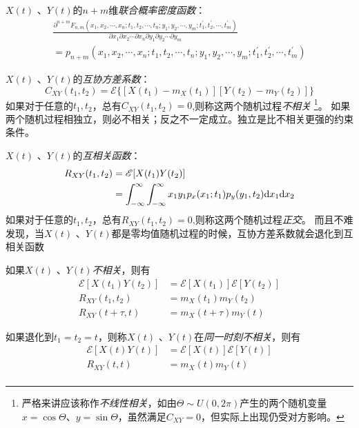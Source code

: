     $X(t)$ 、$Y(t)$的$n+m$维\emph{联合概率密度函数}：
    \begin{equation}
        \begin{split}
            \frac{\partial^{n+m}F_{n,m}(x_1,x_2,\cdots,x_n;t_1,t_2,\cdots,t_n;y_1,y_2,\cdots,y_m;t^{'}_1,t^{'}_2,\cdots,t^{'}_m)}{\partial x_1\partial x_2\cdots\partial x_n\partial y_1\partial y_2\cdots\partial y_m}\\
            =p_{n+m}(x_1,x_2,\cdots,x_n;t_1,t_2,\cdots,t_n;y_1,y_2,\cdots,y_m;t^{'}_1,t^{'}_2,\cdots,t^{'}_m)
        \end{split}
    \end{equation}

    $X(t)$ 、$Y(t)$的\emph{互协方差系数}：
    \begin{equation}
        C_{XY}(t_1,t_2)=\mathscr{E}\{[X(t_1)-m_X(t_1)][Y(t_2)-m_Y(t_2)]\}
    \end{equation}
    如果对于任意的$t_1,t_2$，总有$C_{XY}(t_1,t_2)=0$,则称这两个随机过程\emph{不相关}
    \footnote{严格来讲应该称作\emph{不线性相关}，如由$\Theta\sim U(0,2\pi)$产生的两个随机变量$x=\cos\Theta$、$y=\sin\Theta$，虽然满足$C_{XY}=0$，但实际上出现仍受对方影响。}。 
    如果两个随机过程相独立，则必不相关；反之不一定成立。独立是比不相关更强的约束条件。


    $X(t)$ 、$Y(t)$的\emph{互相关函数}：
    \begin{equation}
        \begin{split}
            R_{XY}(t_1,t_2) &=\mathscr{E}[X(t_1)Y(t_2)]\\
                            &=\int_{-\infty}^{\infty}\int_{-\infty}^{\infty}x_1y_1p_x(x_1;t_1)p_y(y_1,t_2)\text{\upshape d} x_1\text{\upshape d} x_2
        \end{split}
    \end{equation}
    如果对于任意的$t_1,t_2$，总有$R_{XY}(t_1,t_2)=0$,则称这两个随机过程\emph{正交}。
    而且不难发现，当$X(t)$ 、$Y(t)$都是零均值随机过程的时候，互协方差系数就会退化到互相关函数

    如果$X(t)$ 、$Y(t)$\emph{不相关}，则有
    \begin{align}
        \mathscr{E}[X(t_1)Y(t_2)]&=\mathscr{E}[X(t_1)]\mathscr{E}[Y(t_2)]\\
        R_{XY}(t_1,t_2)&=m_X(t_1)m_Y(t_2)\\
        R_{XY}(t+\tau,t)&=m_X(t+\tau)m_Y(t)
    \end{align}

    如果退化到$t_1=t_2=t$，则称$X(t)$ 、$Y(t)$在\emph{同一时刻不相关}，则有
    \begin{align}
        \mathscr{E}[X(t)Y(t)]&=\mathscr{E}[X(t)]\mathscr{E}[Y(t)]\\
        R_{XY}(t,t)&=m_X(t)m_Y(t)\\
    \end{align}

